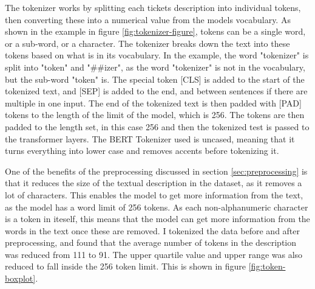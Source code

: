 \documentclass{UoYCSproject}
\begin{document}
    The tokenizer works by splitting each tickets description into individual tokens, then converting these into a numerical value from the models vocabulary.
    As shown in the example in figure \ref{fig:tokenizer-figure}, tokens can be a single word, or a sub-word, or a character. The tokenizer breaks down the text into these tokens based on what is in its vocabulary.
    In the example, the word "tokenizer" is split into "token" and "\#\#izer", as the word "tokenizer" is not in the vocabulary, but the sub-word "token" is.
    The special token [CLS] is added to the start of the tokenized text, and [SEP] is added to the end, and between sentences if there are multiple in one input.
    The end of the tokenized text is then padded with [PAD] tokens to the length of the limit of the model, which is 256.
    The tokens are then padded to the length set, in this case 256 and then the tokenized test is passed to the transformer layers.
    The BERT Tokenizer used is uncased, meaning that it turns everything into lower case and removes accents before tokenizing it.
    \par

    One of the benefits of the preprocessing discussed in section \ref{sec:preprocessing} is that it reduces the size of the textual description in the dataset, as it removes a lot of characters.
    This enables the model to get more information from the text, as the model has a word limit of 256 tokens. As each non-alphanumeric character is a token in iteself, this means that the model can get more information from the words in the text once these are removed.
    I tokenized the data before and after preprocessing, and found that the average number of tokens in the description was reduced from 111 to 91. The upper quartile value and upper range was also reduced to fall inside the 256 token limit.
    This is shown in figure \ref{fig:token-boxplot}.
\end{document}

